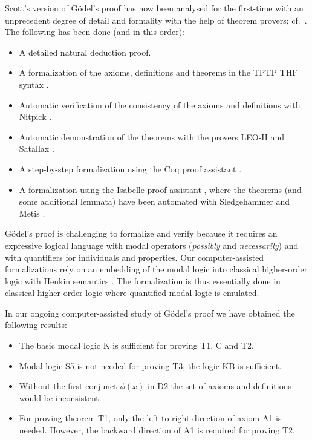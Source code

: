\documentclass{llncs}
\begin{document}
\noindent
Scott's version of G\"{o}del's proof has now been 
analysed for the first-time
with an unprecedent degree of detail 
and formality with the help of theorem provers; cf.~\cite{FormalTheologyRepository}. 
The following has been done (and in this order):
\begin{itemize}
\item A detailed natural deduction proof.
%
\item A formalization of the axioms, definitions and theorems in the TPTP THF syntax \cite{J22}.
%
\item Automatic verification of the consistency of the axioms and 
definitions with Nitpick \cite{Nitpick}.
%
\item Automatic demonstration of the theorems with the provers LEO-II \cite{LEO-II} and Satallax \cite{Satallax}.

\item A step-by-step formalization using the Coq proof assistant \cite{Coq}.

\item A formalization using the Isabelle proof assistant \cite{Isabelle}, where the theorems (and some additional lemmata) have been automated with Sledgehammer \cite{Sledgehammer} and Metis \cite{Hurd03first-orderproof}.
\end{itemize}

G\"{o}del's proof is challenging to formalize and verify because it
requires an expressive logical language with modal operators
(\emph{possibly} and \emph{necessarily}) and with
quantifiers for individuals and properties.  Our computer-assisted formalizations rely on an
embedding of the modal logic into classical higher-order logic with
Henkin semantics \cite{J23,B9}. The formalization is thus essentially
done in classical higher-order logic where  quantified modal logic is
emulated.

In our ongoing computer-assisted study of G\"odel's proof we have
obtained the following results:
\begin{itemize}
\item The basic modal logic K is sufficient for proving T1, C and T2. 
\item Modal logic S5 is not needed for proving T3; the logic KB is
  sufficient. 
\item Without the first conjunct $\phi(x)$ in D2 the set of axioms 
  and definitions would be inconsistent.
\item For proving theorem T1, only the left to right direction of
  axiom A1 is needed. However, the backward direction of A1 is
  required for proving T2.

\end{itemize}
\end{document}
